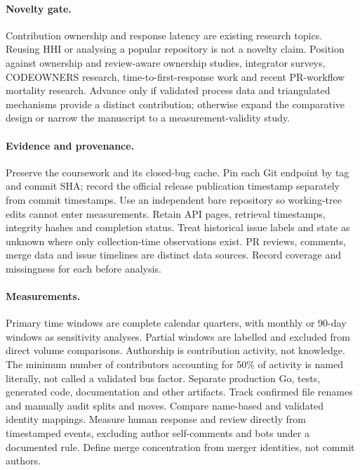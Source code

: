 \documentclass[11pt]{article}
\begin{document}
\paragraph{Novelty gate.} Contribution ownership and response latency are existing
research topics. Reusing HHI or analysing a popular repository is not a novelty
claim. Position against ownership and review-aware ownership studies, integrator
surveys, CODEOWNERS research, time-to-first-response work and recent PR-workflow
mortality research. Advance only if validated process data
and triangulated mechanisms provide a distinct contribution; otherwise expand the
comparative design or narrow the manuscript to a measurement-validity study.

\paragraph{Evidence and provenance.} Preserve the coursework and its closed-bug
cache. Pin each Git endpoint by tag and commit SHA; record the official release
publication timestamp separately from commit timestamps. Use an independent bare
repository so working-tree edits cannot enter measurements. Retain API pages,
retrieval timestamps, integrity hashes and completion status. Treat historical
issue labels and state as unknown where only collection-time observations exist.
PR reviews, comments, merge data and issue timelines are distinct data sources.
Record coverage and missingness for each before analysis.

\paragraph{Measurements.} Primary time windows are complete calendar quarters,
with monthly or 90-day windows as sensitivity analyses. Partial windows are labelled
and excluded from direct volume comparisons. Authorship is contribution activity,
not knowledge. The minimum number of contributors accounting for 50\% of activity
is named literally, not called a validated bus factor. Separate production Go,
tests, generated code, documentation and other artifacts. Track confirmed file
renames and manually audit splits and moves. Compare name-based and validated
identity mappings. Measure human response and review directly from timestamped
events, excluding author self-comments and bots under a documented rule. Define
merge concentration from merger identities, not commit authors.
\end{document}
